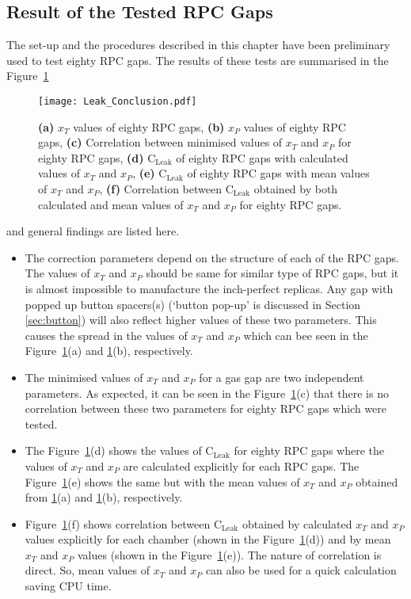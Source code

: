\subsection{Result of the Tested RPC Gaps}
The set-up and the procedures described in this chapter have been preliminary
used to test eighty RPC gaps. The results of these tests are summarised in the
Figure~\ref{fig:conclusion}
\begin{figure}[h]
  \centering
  \texttt{[image: Leak\_Conclusion.pdf]}
  \caption{\textbf{(a)} $x_T$ values of eighty RPC gaps,
    \textbf{(b)} $x_P$ values of eighty RPC gaps,
    \textbf{(c)} Correlation between minimised values of $x_T$ and $x_P$
    for eighty RPC gaps,
    \textbf{(d)} $\textrm{C}_{\textrm{Leak}}$ of eighty RPC gaps with calculated
    values of $x_T$ and $x_P$,
    \textbf{(e)} $\textrm{C}_{\textrm{Leak}}$ of eighty RPC gaps with mean
    values of $x_T$ and $x_P$,
    \textbf{(f)} Correlation between $\textrm{C}_{\textrm{Leak}}$ obtained by
    both calculated and mean values of $x_T$ and $x_P$ for eighty RPC gaps.}
  \label{fig:conclusion}
\end{figure}
and general findings are listed here.
\begin{itemize} \itemsep -3pt
\item The correction parameters depend on the structure of each of the RPC
  gaps. The values of $x_T$ and $x_P$ should be same for similar type of RPC
  gaps, but it is almost impossible to manufacture the inch-perfect replicas.
  Any gap with popped up button spacers(s) (`button pop-up' is discussed in
  Section \ref{sec:button}) will also reflect higher values of these two
  parameters. This causes the spread in the values of $x_T$ and $x_P$ which
  can bee seen in the Figure~\ref{fig:conclusion}(a) and
  \ref{fig:conclusion}(b), respectively.
\item The minimised values of $x_T$ and $x_P$ for a gas gap are two independent
  parameters. As expected, it can be seen in the Figure~\ref{fig:conclusion}(c)
  that there is no correlation between these two parameters for eighty RPC gaps
  which were tested.
\item The Figure~\ref{fig:conclusion}(d) shows the values of
  $\textrm{C}_{\textrm{Leak}}$ for eighty RPC gaps where the values of $x_T$ and
  $x_P$ are calculated explicitly for each RPC gaps. The
  Figure~\ref{fig:conclusion}(e) shows the same but with the mean values of
  $x_T$ and $x_P$ obtained from \ref{fig:conclusion}(a) and
  \ref{fig:conclusion}(b), respectively.
\item Figure~\ref{fig:conclusion}(f) shows correlation between
  $\textrm{C}_{\textrm{Leak}}$ obtained by calculated $x_T$ and $x_P$ values
  explicitly for each chamber (shown in the Figure~\ref{fig:conclusion}(d))
  and by mean $x_T$ and $x_P$ values (shown in the
  Figure~\ref{fig:conclusion}(e)). The nature of correlation is direct.
  So, mean values of $x_T$ and $x_P$ can also be used for a quick calculation
  saving CPU time.
\end{itemize}

